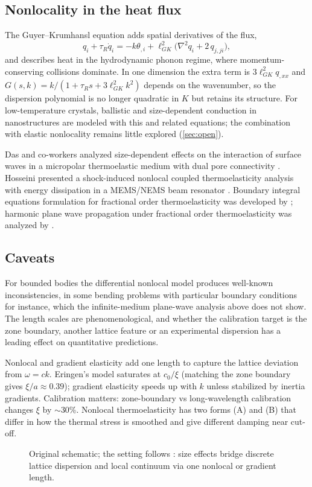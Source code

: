 \subsection{Nonlocality in the heat flux}
The Guyer--Krumhansl equation \citep{GuyerKrumhansl1966,GuyerKrumhansl1966II} adds spatial derivatives of the flux,
\begin{equation}
q_i+\tau_R\dot q_i=-k\theta_{,i}+\ell_{GK}^2\bigl(\nabla^2q_i+2\,q_{j,ji}\bigr),
\end{equation}
and describes heat in the hydrodynamic phonon regime, where momentum-conserving collisions dominate. In one dimension the extra term is $3\ell_{GK}^2q_{,xx}$ and $G(s,k)=k/(1+\tau_Rs+3\ell_{GK}^2k^2)$ depends on the wavenumber, so the dispersion polynomial is no longer quadratic in $K$ but retains its structure. For low-temperature crystals, ballistic and size-dependent conduction in nanostructures are modeled with this and related equations; the combination with elastic nonlocality remains little explored (\cref{sec:open}).

Das and co-workers analyzed size-dependent effects on the interaction of surface waves in a micropolar thermoelastic medium with dual pore connectivity \citep{Das2024}. Hosseini presented a shock-induced nonlocal coupled thermoelasticity analysis with energy dissipation in a MEMS/NEMS beam resonator \citep{Hosseini2017}. Boundary integral equations formulation for fractional order thermoelasticity was developed by \citep{Tiwari2014}; harmonic plane wave propagation under fractional order thermoelasticity was analyzed by \citep{Tiwari2015}.

\subsection{Caveats}
For bounded bodies the differential nonlocal model produces well-known inconsistencies, in some bending problems with particular boundary conditions for instance, which the infinite-medium plane-wave analysis above does not show. The length scales are phenomenological, and whether the calibration target is the zone boundary, another lattice feature or an experimental dispersion has a leading effect on quantitative predictions.

\begin{summarybox}[Summary]
Nonlocal and gradient elasticity add one length to capture the lattice deviation from $\omega=ck$. Eringen's model saturates at $c_0/\xi$ (matching the zone boundary gives $\xi/a\approx0.39$); gradient elasticity speeds up with $k$ unless stabilized by inertia gradients. Calibration matters: zone-boundary vs long-wavelength calibration changes $\xi$ by $\sim$30\%. Nonlocal thermoelasticity has two forms (A) and (B) that differ in how the thermal stress is smoothed and give different damping near cut-off.
\end{summarybox}

\begin{figure}[t!]\centering\small

\caption{Original schematic; the setting follows \citep{BornKarman1912,Eringen1972}: size effects bridge discrete lattice dispersion and local continuum via one nonlocal or gradient length.}\label{fig:size-geo}
\end{figure}
